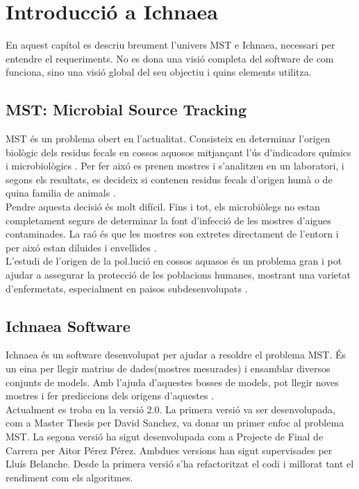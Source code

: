 \chapter{Introducci\'{o} a Ichnaea}
\label{cha:background}
En aquest cap\'{i}tol es descriu breument l'univers MST e Ichnaea, necessari per entendre el requeriments. No es dona una visi\'{o} completa del software de com funciona, sino una visi\'{o} global del seu objectiu i quins elements utilitza. 

\section{MST: Microbial Source Tracking}
\label{sec:mst}
MST \'{e}s un problema obert en l'actualitat. Consisteix en determinar l'origen biol\`{o}gic dels residus fecals en cossos aquosos mitjan\c{c}ant l'\'{u}s d'indicadors qu\'{i}mics i microbiol\`{o}gics \cite{paper}. Per fer aix\'{o} es prenen mostres i s'analitzen en un laboratori, i segons els resultats, es decideix si contenen residus fecals d'origen hum\`{a} o de quina familia de animals \cite{pfc}.\\

Pendre aquesta decisi\'{o} \'{e}s molt dif\'{i}cil. Fins i tot, els microbi\`{o}legs no estan completament segurs de determinar la font d'infecci\'{o} de les mostres d'aigues contaminades. La ra\'{o} \'e{s} que les mostres son extretes directament de l'entorn i per aix\'{o} estan diluides i envellides \cite{pfc}.\\

L'estudi de l'origen de la pol.luci\'{o} en cossos aquasos \'{e}s un problema gran i pot ajudar a assegurar la protecci\'{o} de les poblacions humanes, mostrant una varietat d'enfermetats, especialment en paisos subdesenvolupats \cite{pfc}.\\

\section{Ichnaea Software}
Ichnaea \'{e}s un software desenvolupat per ajudar a resoldre el problema MST. \'{E}s un eina per llegir matrius de dades(mostres mesurades) i ensamblar diversos conjunts de models. Amb l'ajuda d'aquestes bosses de models, pot llegir noves mostres i fer prediccions dels origens d'aquestes \cite{pfc}.\\
 
Actualment es troba en la versi\'{o} 2.0. La primera versi\'{o} va ser desenvolupada, com a Master Thesis per David Sanchez, va donar un primer enfoc al problema MST. La segona versi\'{o} ha sigut desenvolupada com a Projecte de Final de Carrera per Aitor P\'{e}rez P\'{e}rez. Ambdues versions han sigut supervisades per Llu\'{i}s Belanche. Desde la primera versi\'{o} s'ha refactoritzat el codi i millorat tant el rendiment com els algoritmes.\\


